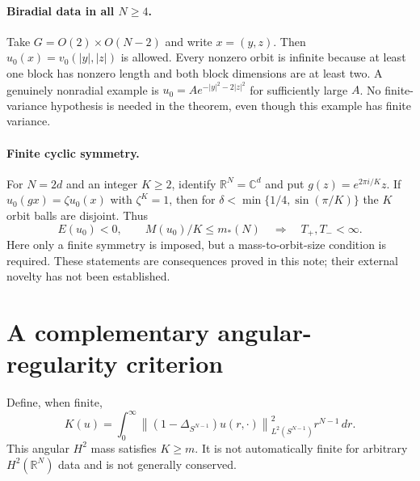 \documentclass[11pt,a4paper]{article}
\theoremstyle{remark}\newtheorem{remark}[theorem]{Remark}
\newcommand{\R}{\mathbb R}
\newcommand{\C}{\mathbb C}
\newcommand{\norm}[1]{\left\|#1\right\|}
\begin{document}
\paragraph{Biradial data in all $N\ge4$.}
Take $G=O(2)\times O(N-2)$ and write $x=(y,z)$. Then
$u_0(x)=v_0(|y|,|z|)$ is allowed. Every nonzero orbit is infinite because at least one block has nonzero length and both block dimensions are at least two. A genuinely nonradial example is
$u_0=Ae^{-|y|^2-2|z|^2}$ for sufficiently large $A$. No finite-variance hypothesis is needed in the theorem, even though this example has finite variance.

\paragraph{Finite cyclic symmetry.}
For $N=2d$ and an integer $K\ge2$, identify $\R^N=\C^d$ and put $g(z)=e^{2\pi i/K}z$. If
$u_0(gx)=\zeta u_0(x)$ with $\zeta^K=1$, then for
$\delta<\min\{1/4,\sin(\pi/K)\}$ the $K$ orbit balls are disjoint. Thus
\[
 E(u_0)<0,\qquad M(u_0)/K\le m_*(N)
 \quad\Longrightarrow\quad T_+,T_-<\infty.
\]
Here only a finite symmetry is imposed, but a mass-to-orbit-size condition is required. These statements are consequences proved in this note; their external novelty has not been established.

\section{A complementary angular-regularity criterion}
Define, when finite,
\[
 K(u)=\int_0^\infty\norm{(1-\Delta_{S^{N-1}})u(r,\cdot)}_{L^2(S^{N-1})}^2r^{N-1}\,dr.
\]
This angular $H^2$ mass satisfies $K\ge m$. It is not automatically finite for arbitrary $H^2(\R^N)$ data and is not generally conserved.
\end{document}
